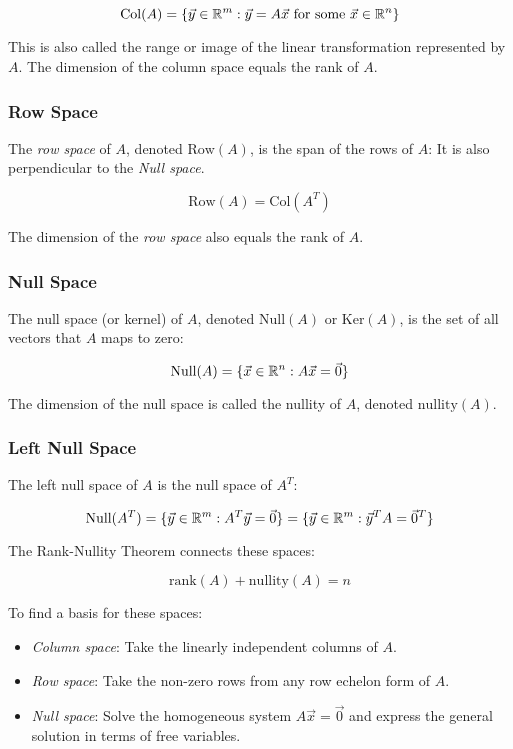 \[
    \text{Col}(A) = \{\vec{y} \in \mathbb{R}^m : \vec{y} = A\vec{x} \text{ for some } \vec{x} \in \mathbb{R}^n\}
\]

This is also called the range or image of the linear transformation represented by \(A\). The dimension of the column space equals the rank of \(A\).

\subsubsection{Row Space}

The \emph{row space} of \(A\), denoted \(\text{Row}(A)\), is the span of the rows of \(A\):
 It is also perpendicular to the \emph{Null space}.

\[
    \text{Row}(A) = \text{Col}(A^T)
\]

The dimension of the \emph{row space} also equals the rank of \(A\).

\subsubsection{Null Space}

The null space (or kernel) of \(A\), denoted \(\text{Null}(A)\) or \(\text{Ker}(A)\), 
is the set of all vectors that \(A\) maps to zero:

\[
    \text{Null}(A) = \{\vec{x} \in \mathbb{R}^n : A\vec{x} = \vec{0}\}
\]

The dimension of the null space is called the nullity of \(A\), denoted \(\text{nullity}(A)\).

\subsubsection{Left Null Space}

The left null space of \(A\) is the null space of \(A^T\):

\[
    \text{Null}(A^T) = \{\vec{y} \in \mathbb{R}^m : A^T\vec{y} = \vec{0}\} = \{\vec{y} \in \mathbb{R}^m : \vec{y}^T A = \vec{0}^T\}
\]

The Rank-Nullity Theorem connects these spaces:

\[
    \text{rank}(A) + \text{nullity}(A) = n
\]

To find a basis for these spaces:

\begin{itemize}

    \item \emph{Column space}: Take the linearly independent columns of \(A\).

    \item \emph{Row space}: Take the non-zero rows from any row echelon form of \(A\).    

    \item \emph{Null space}: Solve the homogeneous system \(A\vec{x} = \vec{0}\) and express the general 
          solution in terms of free variables.
\end{itemize}


